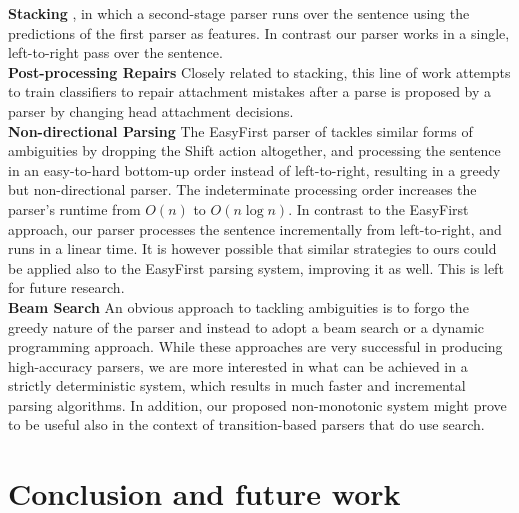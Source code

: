 \documentclass[11pt,letterpaper]{article}
\begin{document}
\noindent\textbf{Stacking} \citep{nivre-mcdonald-stacking,torresmartins:08:stacking}, in which a second-stage parser runs over the sentence using the predictions of the first parser as features. In contrast our parser works in a single, left-to-right pass over the sentence.\\
\noindent\textbf{Post-processing Repairs} \citep{attardi:07,hall05iwpt}
Closely related to stacking, this line of work attempts to train classifiers
to repair attachment mistakes after a parse is proposed by a parser by
changing head attachment decisions.\\
\noindent\textbf{Non-directional Parsing} 
The EasyFirst parser of \citet{goldberg10}
tackles similar forms of
ambiguities by dropping the Shift action altogether, and processing the
sentence in an easy-to-hard bottom-up order instead of left-to-right,
resulting in a greedy but non-directional parser.  The indeterminate
processing order increases the parser's runtime from $O(n)$ to $O(n\log{}n)$.
In contrast to the EasyFirst approach, our parser processes the sentence
incrementally from left-to-right, and runs in a linear time.  It is however
possible that similar strategies to ours could be applied also to the
EasyFirst parsing system, improving it as well. This is left for future
research.\\
\noindent\textbf{Beam Search} An obvious approach to tackling
ambiguities is to forgo the greedy nature of the parser and instead to adopt a
beam search \citep{zhang:08,zhang:11} or a dynamic programming \citep{huang:10,kuhlmann:11}
approach. While these approaches are very successful in producing
high-accuracy parsers, we are more interested in what can be achieved in a
strictly deterministic system, which results in much faster and incremental
parsing algorithms.  In addition, our proposed non-monotonic system might
prove to be useful also in the context of transition-based parsers that do use
search.


\section{Conclusion and future work}
\end{document}
